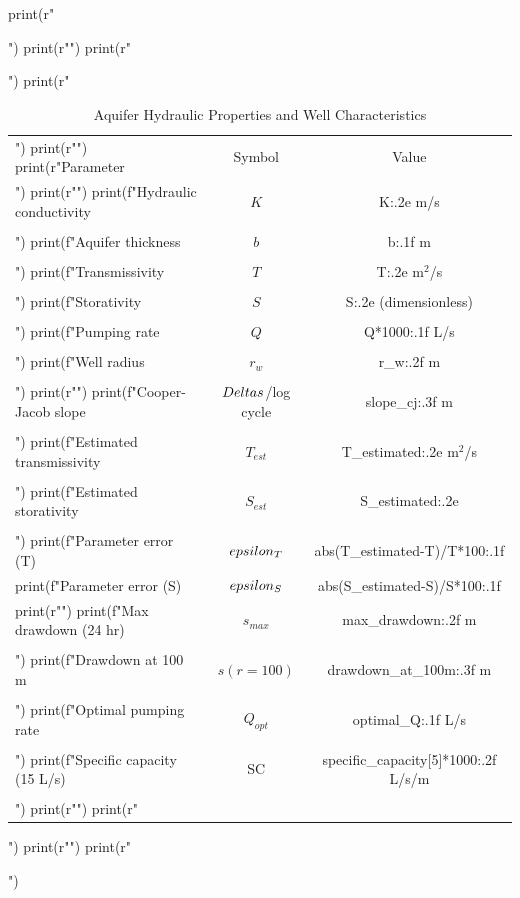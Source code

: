 \documentclass[a4paper, 11pt]{article}
\begin{document}
\begin{pycode}
print(r"\begin{table}[H]")
print(r"\centering")
print(r"\caption{Aquifer Hydraulic Properties and Well Characteristics}")
print(r"\begin{tabular}{lcc}")
print(r"\toprule")
print(r"Parameter & Symbol & Value \\")
print(r"\midrule")
print(f"Hydraulic conductivity & $K$ & {K:.2e} m/s \\\\")
print(f"Aquifer thickness & $b$ & {b:.1f} m \\\\")
print(f"Transmissivity & $T$ & {T:.2e} m$^2$/s \\\\")
print(f"Storativity & $S$ & {S:.2e} (dimensionless) \\\\")
print(f"Pumping rate & $Q$ & {Q*1000:.1f} L/s \\\\")
print(f"Well radius & $r_w$ & {r_w:.2f} m \\\\")
print(r"\midrule")
print(f"Cooper-Jacob slope & $\\Delta s$/log cycle & {slope_cj:.3f} m \\\\")
print(f"Estimated transmissivity & $T_{est}$ & {T_estimated:.2e} m$^2$/s \\\\")
print(f"Estimated storativity & $S_{est}$ & {S_estimated:.2e} \\\\")
print(f"Parameter error (T) & $\\epsilon_T$ & {abs(T_estimated-T)/T*100:.1f}\\%
print(f"Parameter error (S) & $\\epsilon_S$ & {abs(S_estimated-S)/S*100:.1f}\\%
print(r"\midrule")
print(f"Max drawdown (24 hr) & $s_{max}$ & {max_drawdown:.2f} m \\\\")
print(f"Drawdown at 100 m & $s(r=100)$ & {drawdown_at_100m:.3f} m \\\\")
print(f"Optimal pumping rate & $Q_{opt}$ & {optimal_Q:.1f} L/s \\\\")
print(f"Specific capacity (15 L/s) & SC & {specific_capacity[5]*1000:.2f} L/s/m \\\\")
print(r"\bottomrule")
print(r"\end{tabular}")
print(r"\label{tab:results}")
print(r"\end{table}")
\end{pycode}
\end{document}
